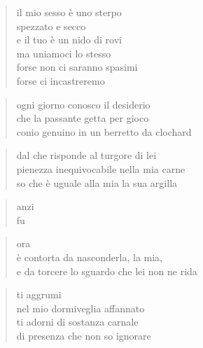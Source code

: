 
\vspace*{2cm}

	\begin{verse}
		il mio sesso è uno sterpo\\
		spezzato e secco\\
		e il tuo è un nido di rovi\\
		ma uniamoci lo stesso\\
		forse non ci saranno spasimi\\
		forse ci incastreremo
	\end{verse}

\clearpage


\vspace*{2cm}

	\begin{verse}
		ogni giorno conosco il desiderio\\
		che la passante getta per gioco\\
		conio genuino in un berretto da clochard
	\end{verse}

	\begin{verse}
		dal che risponde al turgore di lei\\
		pienezza inequivocabile nella mia carne\\
		so che è uguale alla mia la sua argilla
	\end{verse}

	\begin{verse}
		anzi\\
		fu
	\end{verse}

	\begin{verse}
		ora\\
		è contorta da nasconderla, la mia,\\
		e da torcere lo sguardo che lei non ne rida
	\end{verse}

\clearpage


\vspace*{2cm}

	\begin{verse}
		ti aggrumi\\
		nel mio dormiveglia affannato\\
		ti adorni di sostanza carnale\\
		di presenza che non so ignorare
	\end{verse}

